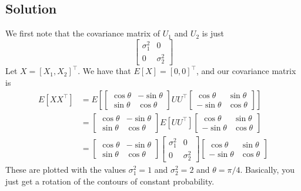 \documentclass[a4paper]{article}
\begin{document}
\subsection*{Solution}%
We first note that the covariance matrix of $U_1$ and $U_2$ is just 
\[
  \begin{bmatrix}
    \sigma_1^2 & 0 \\
    0 & \sigma_2^2 
  \end{bmatrix}
\]
Let $X = [X_1, X_2]^\top$. We have that $E[X] = [0, 0]^\top$, and our covariance matrix is
\[
  \begin{aligned}
    E[XX^\top] &= E \left[
  \begin{bmatrix}
    \cos \theta & -\sin \theta \\
    \sin \theta & \cos \theta
  \end{bmatrix}
  UU^\top
  \begin{bmatrix}
    \cos \theta & \sin \theta \\
    -\sin \theta & \cos \theta
\end{bmatrix} \right]\\
               &=
  \begin{bmatrix}
    \cos \theta & -\sin \theta \\
    \sin \theta & \cos \theta
  \end{bmatrix}
  E[UU^\top]
  \begin{bmatrix}
    \cos \theta & \sin \theta \\
    -\sin \theta & \cos \theta
  \end{bmatrix} \\
               &= \begin{bmatrix}
    \cos \theta & -\sin \theta \\
    \sin \theta & \cos \theta
  \end{bmatrix}
  \begin{bmatrix}
    \sigma_1^2 & 0 \\
    0 & \sigma_2^2 
  \end{bmatrix}
  \begin{bmatrix}
    \cos \theta & \sin \theta \\
    -\sin \theta & \cos \theta
  \end{bmatrix}
  \end{aligned}
\]
These are plotted with the values $\sigma_1^2 = 1$ and $\sigma_2^2=2$ and $\theta = \pi/4$. Basically, you just get a rotation of the contours of constant probability.
\end{document}
